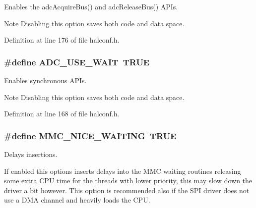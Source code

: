 Enables the {\ttfamily adc\+Acquire\+Bus()} and {\ttfamily adc\+Release\+Bus()} A\+P\+Is. 

\begin{DoxyNote}{Note}
Disabling this option saves both code and data space. 
\end{DoxyNote}


Definition at line 176 of file halconf.\+h.

\hypertarget{group__HAL__CONF_ga39e892a4090185fbdda9bb105bc03b4f}{}
\subsubsection[{A\+D\+C\+\_\+\+U\+S\+E\+\_\+\+W\+A\+I\+T}]{\setlength{\rightskip}{0pt plus 5cm}\#define A\+D\+C\+\_\+\+U\+S\+E\+\_\+\+W\+A\+I\+T~T\+R\+U\+E}\label{group__HAL__CONF_ga39e892a4090185fbdda9bb105bc03b4f}


Enables synchronous A\+P\+Is. 

\begin{DoxyNote}{Note}
Disabling this option saves both code and data space. 
\end{DoxyNote}


Definition at line 168 of file halconf.\+h.

\hypertarget{group__HAL__CONF_ga3087dfffa81dd8a0a80ee92746e65fe2}{}
\subsubsection[{M\+M\+C\+\_\+\+N\+I\+C\+E\+\_\+\+W\+A\+I\+T\+I\+N\+G}]{\setlength{\rightskip}{0pt plus 5cm}\#define M\+M\+C\+\_\+\+N\+I\+C\+E\+\_\+\+W\+A\+I\+T\+I\+N\+G~T\+R\+U\+E}\label{group__HAL__CONF_ga3087dfffa81dd8a0a80ee92746e65fe2}


Delays insertions. 

If enabled this options inserts delays into the M\+M\+C waiting routines releasing some extra C\+P\+U time for the threads with lower priority, this may slow down the driver a bit however. This option is recommended also if the S\+P\+I driver does not use a D\+M\+A channel and heavily loads the C\+P\+U. 

